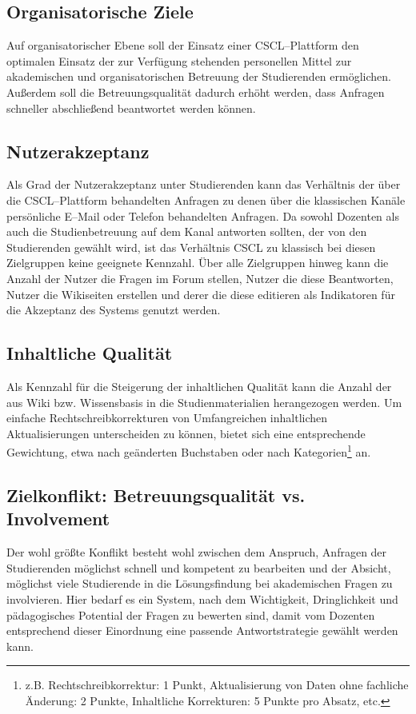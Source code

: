 \subsection{Organisatorische Ziele} %
\label{sub:organisatorische_ziele}
Auf organisatorischer Ebene soll der Einsatz einer CSCL–Plattform den optimalen Einsatz der zur Verfügung stehenden personellen Mittel zur akademischen und organisatorischen Betreuung der Studierenden ermöglichen. Außerdem soll die Betreuungsqualität dadurch erhöht werden, dass Anfragen schneller abschließend beantwortet werden können. 

\subsection{Nutzerakzeptanz} %
\label{sub:nutzerakzeptanz}
Als Grad der Nutzerakzeptanz unter Studierenden kann das Verhältnis der über die CSCL–Plattform behandelten Anfragen zu denen über die klassischen Kanäle persönliche E–Mail oder Telefon behandelten Anfragen. Da sowohl Dozenten als auch die Studienbetreuung auf dem Kanal antworten sollten, der von den Studierenden gewählt wird, ist das Verhältnis CSCL zu klassisch bei diesen Zielgruppen keine geeignete Kennzahl. Über alle Zielgruppen hinweg kann die Anzahl der Nutzer die Fragen im Forum stellen, Nutzer die diese Beantworten, Nutzer die Wikiseiten erstellen und derer die diese editieren als Indikatoren für die Akzeptanz des Systems genutzt werden.

\subsection{Inhaltliche Qualität} %
\label{sub:inhaltliche_qualitat}
Als Kennzahl für die Steigerung der inhaltlichen Qualität kann die Anzahl der aus Wiki bzw. Wissensbasis in die Studienmaterialien herangezogen werden. Um einfache Rechtschreibkorrekturen von Umfangreichen inhaltlichen Aktualisierungen unterscheiden zu können, bietet sich eine entsprechende Gewichtung, etwa nach geänderten Buchstaben oder nach Kategorien\footnote{z.B. Rechtschreibkorrektur: 1 Punkt, Aktualisierung von Daten ohne fachliche Änderung: 2 Punkte, Inhaltliche Korrekturen: 5 Punkte pro Absatz, etc.} an.

\subsection{Zielkonflikt: Betreuungsqualität vs. Involvement} %
\label{sub:zielkonflikt_betreuungsqualitat_vs_involvement}
Der wohl größte Konflikt besteht wohl zwischen dem Anspruch, Anfragen der Studierenden möglichst schnell und kompetent zu bearbeiten und der Absicht, möglichst viele Studierende in die Lösungsfindung bei akademischen Fragen zu involvieren. Hier bedarf es ein System, nach dem Wichtigkeit, Dringlichkeit und pädagogisches Potential der Fragen zu bewerten sind, damit vom Dozenten entsprechend dieser Einordnung eine passende Antwortstrategie gewählt werden kann. 

